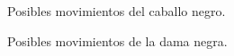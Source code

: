 \documentclass[conference]{IEEEtran}
\begin{document}
    \begin{figure}[ht]
        \caption{Posibles movimientos del caballo negro.}
        \label{posibles movimientoscaballonegro}
    \end{figure}
    
    \begin{figure}[ht]
        \caption{Posibles movimientos de la dama negra.}
        \label{posibles movimientosdamanegra}
    \end{figure}
    
\end{document}
